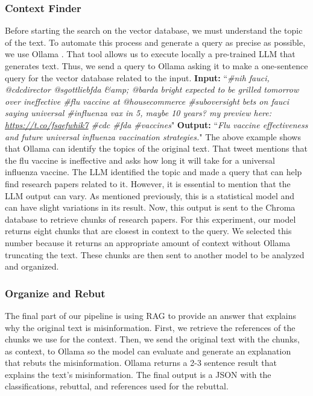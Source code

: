 \subsubsection{Context Finder}
Before starting the search on the vector database, we must understand the topic of the text. To automate this process and generate a query as precise as possible, we use Ollama \cite{ollama}. That tool allows us to execute locally a pre-trained LLM that generates text. Thus, we send a query to Ollama asking it to make a one-sentence query for the vector database related to the input.
\newline
{\small
\textbf{Input:} ``\textit{\#nih fauci, @cdcdirector @sgottliebfda \&amp; @barda bright expected to be grilled tomorrow over ineffective \#flu vaccine at @housecommerce \#suboversight bets on fauci saying universal \#influenza vax in 5, maybe 10 years? my preview here: \url{https://t.co/fsqefwhik7} \#cdc \#fda \#vaccines}"
\newline
\textbf{Output:} ``\textit{Flu vaccine effectiveness and future universal influenza vaccination strategies.}"
 \newline
 }
\indent The above example shows that Ollama can identify the topics of the original text. That tweet mentions that the flu vaccine is ineffective and asks how long it will take for a universal influenza vaccine. The LLM identified the topic and made a query that can help find
research papers related to it. However, it is essential to mention that the LLM output can vary. As mentioned previously, this is a statistical model and can have slight variations in its result. Now, this output is sent to the Chroma database to retrieve chunks of research
papers. For this experiment, our model returns eight chunks that are closest in context to the query. We selected this number because it returns an appropriate amount of context without Ollama truncating the text. These chunks are then sent to another model to be analyzed and organized.

\subsubsection{Organize and Rebut}
The final part of our pipeline is using RAG to provide an answer that explains why the original text is misinformation. First, we retrieve the references of the chunks we use for the context. Then, we send the original text with the chunks, as context, to Ollama so the model can evaluate and generate an explanation that rebuts the misinformation. Ollama returns a 2-3 sentence result that explains the text’s misinformation. The final output is a JSON with the classifications, rebuttal, and references used for the rebuttal.


